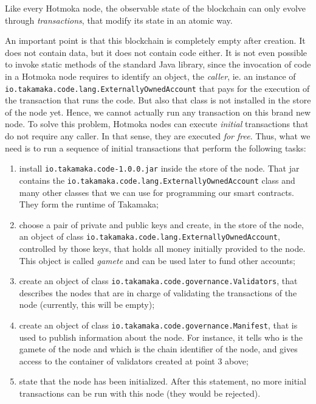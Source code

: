 \documentclass[a4paper,]{book}
\providecommand{\tightlist}{%
  \setlength{\itemsep}{0pt}\setlength{\parskip}{0pt}}
\begin{document}
{Like every Hotmoka node, the observable state of the blockchain can only
evolve through \emph{transactions}, that modify its state in an atomic
way.

An important point is that this blockchain is completely empty after
creation. It does not contain data, but it does not contain code either.
It is not even possible to invoke static methods of the standard Java
library, since the invocation of code in a Hotmoka node requires to
identify an object, the \emph{caller}, ie. an instance of
\texttt{io.takamaka.code.lang.ExternallyOwnedAccount} that pays for the
execution of the transaction that runs the code. But also that class is
not installed in the store of the node yet. Hence, we cannot actually
run any transaction on this brand new node. To solve this problem,
Hotmoka nodes can execute \emph{initial} transactions that do not
require any caller. In that sense, they are executed \emph{for free}.
Thus, what we need is to run a sequence of initial transactions that
perform the following tasks:

\begin{enumerate}
\def\labelenumi{\arabic{enumi}.}
\tightlist
\item
  install \texttt{io.takamaka.code-1.0.0.jar} inside the store of the
  node. That jar contains the
  \texttt{io.takamaka.code.lang.ExternallyOwnedAccount} class and many
  other classes that we can use for programming our smart contracts.
  They form the runtime of Takamaka;
\item
  choose a pair of private and public keys and create, in the store of
  the node, an object of class
  \texttt{io.takamaka.code.lang.ExternallyOwnedAccount}, controlled by
  those keys, that holds all money initially provided to the node. This
  object is called \emph{gamete} and can be used later to fund other
  accounts;
\item
  create an object of class
  \texttt{io.takamaka.code.governance.Validators}, that describes the
  nodes that are in charge of validating the transactions of the node
  (currently, this will be empty);
\item
  create an object of class
  \texttt{io.takamaka.code.governance.Manifest}, that is used to publish
  information about the node. For instance, it tells who is the gamete
  of the node and which is the chain identifier of the node, and gives
  access to the container of validators created at point 3 above;
\item
  state that the node has been initialized. After this statement, no
  more initial transactions can be run with this node (they would be
  rejected).
\end{enumerate}

}
\end{document}
